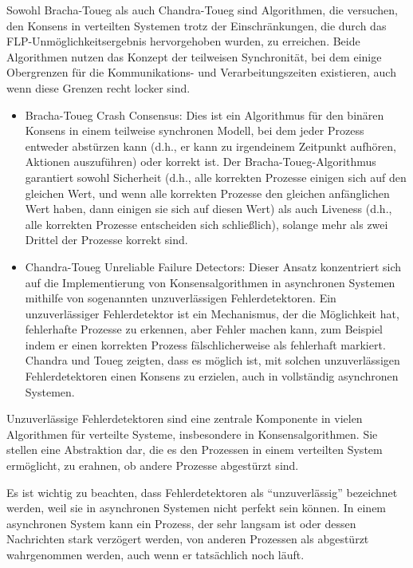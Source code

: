 Sowohl Bracha-Toueg als auch Chandra-Toueg sind Algorithmen, die versuchen, den Konsens in verteilten Systemen trotz der Einschränkungen, die durch das FLP-Unmöglichkeitsergebnis hervorgehoben wurden, zu erreichen. Beide Algorithmen nutzen das Konzept der teilweisen Synchronität, bei dem einige Obergrenzen für die Kommunikations- und Verarbeitungszeiten existieren, auch wenn diese Grenzen recht locker sind.
\begin{itemize}
\item Bracha-Toueg Crash Consensus: Dies ist ein Algorithmus für den binären Konsens in einem teilweise synchronen Modell, bei dem jeder Prozess entweder abstürzen kann (d.h., er kann zu irgendeinem Zeitpunkt aufhören, Aktionen auszuführen) oder korrekt ist. Der Bracha-Toueg-Algorithmus garantiert sowohl Sicherheit (d.h., alle korrekten Prozesse einigen sich auf den gleichen Wert, und wenn alle korrekten Prozesse den gleichen anfänglichen Wert haben, dann einigen sie sich auf diesen Wert) als auch Liveness (d.h., alle korrekten Prozesse entscheiden sich schließlich), solange mehr als zwei Drittel der Prozesse korrekt sind.
\item Chandra-Toueg Unreliable Failure Detectors: Dieser Ansatz konzentriert sich auf die Implementierung von Konsensalgorithmen in asynchronen Systemen mithilfe von sogenannten unzuverlässigen Fehlerdetektoren. Ein unzuverlässiger Fehlerdetektor ist ein Mechanismus, der die Möglichkeit hat, fehlerhafte Prozesse zu erkennen, aber Fehler machen kann, zum Beispiel indem er einen korrekten Prozess fälschlicherweise als fehlerhaft markiert. Chandra und Toueg zeigten, dass es möglich ist, mit solchen unzuverlässigen Fehlerdetektoren einen Konsens zu erzielen, auch in vollständig asynchronen Systemen.
\end{itemize}    

Unzuverlässige Fehlerdetektoren sind eine zentrale Komponente in vielen Algorithmen für verteilte Systeme, insbesondere in Konsensalgorithmen. Sie stellen eine Abstraktion dar, die es den Prozessen in einem verteilten System ermöglicht, zu erahnen, ob andere Prozesse abgestürzt sind.

Es ist wichtig zu beachten, dass Fehlerdetektoren als \enquote{unzuverlässig} bezeichnet werden, weil sie in asynchronen Systemen nicht perfekt sein können. In einem asynchronen System kann ein Prozess, der sehr langsam ist oder dessen Nachrichten stark verzögert werden, von anderen Prozessen als abgestürzt wahrgenommen werden, auch wenn er tatsächlich noch läuft.

